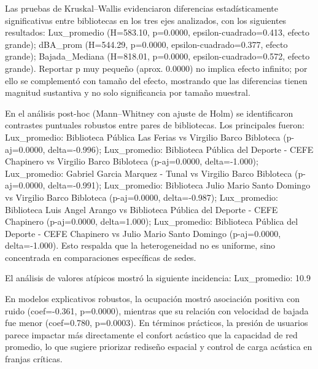 Las pruebas de Kruskal--Wallis evidenciaron diferencias estadísticamente significativas entre bibliotecas en los tres ejes analizados, con los siguientes resultados: Lux\_promedio (H=583.10, p=0.0000, epsilon-cuadrado=0.413, efecto grande); dBA\_prom (H=544.29, p=0.0000, epsilon-cuadrado=0.377, efecto grande); Bajada\_Mediana (H=818.01, p=0.0000, epsilon-cuadrado=0.572, efecto grande). Reportar p muy pequeño (aprox. 0.0000) no implica efecto infinito; por ello se complementó con tamaño del efecto, mostrando que las diferencias tienen magnitud sustantiva y no solo significancia por tamaño muestral.

En el análisis post-hoc (Mann--Whitney con ajuste de Holm) se identificaron contrastes puntuales robustos entre pares de bibliotecas. Los principales fueron: Lux\_promedio: Biblioteca Pública Las Ferias vs Virgilio Barco Bibloteca (p-aj=0.0000, delta=-0.996); Lux\_promedio: Biblioteca Pública del Deporte - CEFE Chapinero vs Virgilio Barco Bibloteca (p-aj=0.0000, delta=-1.000); Lux\_promedio: Gabriel Garcia Marquez - Tunal vs Virgilio Barco Bibloteca (p-aj=0.0000, delta=-0.991); Lux\_promedio: Biblioteca Julio Mario Santo Domingo vs Virgilio Barco Bibloteca (p-aj=0.0000, delta=-0.987); Lux\_promedio: Biblioteca Luis Angel Arango vs Biblioteca Pública del Deporte - CEFE Chapinero (p-aj=0.0000, delta=1.000); Lux\_promedio: Biblioteca Pública del Deporte - CEFE Chapinero vs Julio Mario Santo Domingo (p-aj=0.0000, delta=-1.000). Esto respalda que la heterogeneidad no es uniforme, sino concentrada en comparaciones específicas de sedes.

El análisis de valores atípicos mostró la siguiente incidencia: Lux\_promedio: 10.9%

En modelos explicativos robustos, la ocupación mostró asociación positiva con ruido (coef=-0.361, p=0.0000), mientras que su relación con velocidad de bajada fue menor (coef=0.780, p=0.0003). En términos prácticos, la presión de usuarios parece impactar más directamente el confort acústico que la capacidad de red promedio, lo que sugiere priorizar rediseño espacial y control de carga acústica en franjas críticas.
